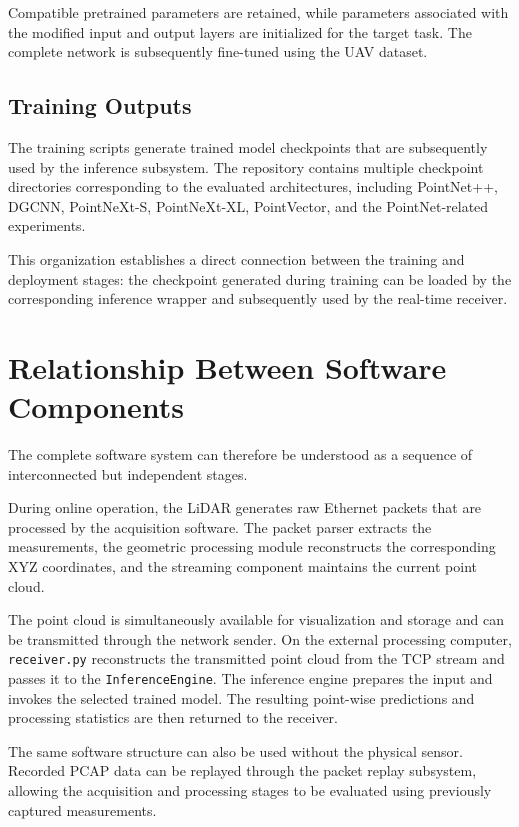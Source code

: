 Compatible pretrained parameters are retained, while parameters associated with the modified input and output layers are initialized for the target task. The complete network is subsequently fine-tuned using the UAV dataset.

\subsection{Training Outputs}

The training scripts generate trained model checkpoints that are subsequently used by the inference subsystem. The repository contains multiple checkpoint directories corresponding to the evaluated architectures, including PointNet++, DGCNN, PointNeXt-S, PointNeXt-XL, PointVector, and the PointNet-related experiments.

This organization establishes a direct connection between the training and deployment stages: the checkpoint generated during training can be loaded by the corresponding inference wrapper and subsequently used by the real-time receiver.

\section{Relationship Between Software Components}
\label{sec:software_pipeline}

The complete software system can therefore be understood as a sequence of interconnected but independent stages.

During online operation, the LiDAR generates raw Ethernet packets that are processed by the acquisition software. The packet parser extracts the measurements, the geometric processing module reconstructs the corresponding XYZ coordinates, and the streaming component maintains the current point cloud.

The point cloud is simultaneously available for visualization and storage and can be transmitted through the network sender. On the external processing computer, \texttt{receiver.py} reconstructs the transmitted point cloud from the TCP stream and passes it to the \texttt{InferenceEngine}. The inference engine prepares the input and invokes the selected trained model. The resulting point-wise predictions and processing statistics are then returned to the receiver.

The same software structure can also be used without the physical sensor. Recorded PCAP data can be replayed through the packet replay subsystem, allowing the acquisition and processing stages to be evaluated using previously captured measurements.

